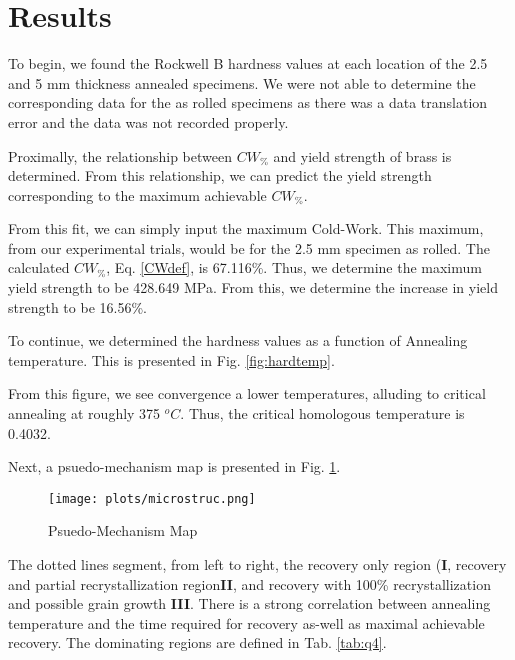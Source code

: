 \documentclass{article}
\begin{document}
\newpage
\section{Results}
To begin, we found the Rockwell B hardness values at each location of the 2.5 and 5 mm thickness annealed specimens. We were not able to determine the corresponding data for the as rolled specimens as there was a data translation error and the data was not recorded properly. 

Proximally, the relationship between $CW_{\%}$ and yield strength of brass is determined. From this relationship, we can predict the yield strength corresponding to the maximum achievable $CW_{\%}$. 


From this fit, we can simply input the maximum Cold-Work. This maximum, from our experimental trials, would be for the 2.5 mm specimen as rolled. The calculated $CW_{\%}$, Eq. \ref{CWdef}, is 67.116\%. Thus, we determine the maximum yield strength to be 428.649 MPa. From this, we determine the increase in yield strength to be 16.56\%. 

To continue, we determined the hardness values as a function of Annealing temperature. This is presented in Fig. \ref{fig:hardtemp}.


From this figure, we see convergence a lower temperatures, alluding to critical annealing at roughly 375 $^oC$. Thus, the critical homologous temperature is 0.4032. 

Next, a psuedo-mechanism map is presented in Fig. \ref{fig:map}.
\newpage

\begin{figure}[!h!]
    \centering
    \texttt{[image: plots/microstruc.png]}
    \caption{Psuedo-Mechanism Map}
    \label{fig:map}
\end{figure}
\newpage

The dotted lines segment, from left to right, the recovery only region (\textbf{I}, recovery and partial recrystallization region\textbf{II}, and recovery with 100\% recrystallization and possible grain growth \textbf{III}. There is a strong correlation between annealing temperature and the time required for recovery as-well as maximal achievable recovery. The dominating regions are defined in Tab. \ref{tab:q4}.
\end{document}
